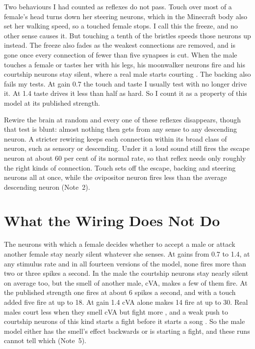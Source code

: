\documentclass[11pt,a4paper]{article}
\newcommand{\note}[1]{(Note~#1)}
\begin{document}
Two behaviours I had counted as reflexes do not pass. Touch over most of a female's head turns down her steering neurons, which in the Minecraft body also set her walking speed, so a touched female stops. I call this the freeze, and no other sense causes it. But touching a tenth of the bristles speeds those neurons up instead. The freeze also fades as the weakest connections are removed, and is gone once every connection of fewer than five synapses is cut. When the male touches a female or tastes her with his legs, his moonwalker neurons fire and his courtship neurons stay silent, where a real male starts courting \citep{kohatsu2011female,clowney2015multimodal}. The backing also fails my tests. At gain 0.7 the touch and taste I usually test with no longer drive it. At 1.4 taste drives it less than half as hard. So I count it as a property of this model at its published strength.

Rewire the brain at random and every one of these reflexes disappears, though that test is blunt: almost nothing then gets from any sense to any descending neuron. A stricter rewiring keeps each connection within its broad class of neuron, such as sensory or descending. Under it a loud sound still fires the escape neuron at about 60 per cent of its normal rate, so that reflex needs only roughly the right kinds of connection. Touch sets off the escape, backing and steering neurons all at once, while the ovipositor neuron fires less than the average descending neuron \note{2}.

\section{What the Wiring Does Not Do}
\label{sec:absent}

The neurons with which a female decides whether to accept a male or attack another female stay nearly silent whatever she senses. At gains from 0.7 to 1.4, at any stimulus rate and in all fourteen versions of the model, none fires more than two or three spikes a second. In the male the courtship neurons stay nearly silent on average too, but the smell of another male, cVA, makes a few of them fire. At the published strength one fires at about 6 spikes a second, and with a touch added five fire at up to 18. At gain 1.4 cVA alone makes 14 fire at up to 30. Real males court less when they smell cVA \citep{kurtovic2007single} but fight more \citep{wang2010identification}, and a weak push to courtship neurons of this kind starts a fight before it starts a song \citep{hoopfer2015p1}. So the male model either has the smell's effect backwards or is starting a fight, and these runs cannot tell which \note{5}.
\end{document}
